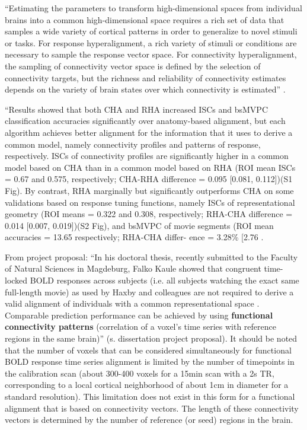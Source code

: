 ``Estimating the parameters to transform high-dimensional spaces from individual
brains into a common high-dimensional space requires a rich set of data that
samples a wide variety of cortical patterns in order to generalize to novel
stimuli or tasks. For response hyperalignment, a rich variety of stimuli or
conditions are necessary to sample the response vector space. For connectivity
hyperalignment, the sampling of connectivity vector space is defined by the
selection of connectivity targets, but the richness and reliability of
connectivity estimates depends on the variety of brain states over which
connectivity is estimated'' \citep{haxby2020hyperalignment}.

%
``Results showed that both CHA and RHA increased ISCs and bsMVPC classification
accuracies significantly over anatomy-based alignment, but each algorithm
achieves better alignment for the information that it uses to derive a common
model, namely connectivity profiles and patterns of response, respectively. ISCs
of connectivity profiles are significantly higher in a common model based on CHA
than in a common model based on RHA (ROI mean ISCs = 0.67 and 0.575,
respectively; CHA-RHA difference = 0.095 [0.081, 0.112])(S1 Fig). By contrast,
RHA marginally but significantly outperforms CHA on some validations based on
response tuning functions, namely ISCs of representational geometry (ROI means =
0.322 and 0.308, respectively; RHA-CHA difference = 0.014 [0.007, 0.019])(S2
Fig), and bsMVPC of movie segments (ROI mean accuracies = 13.65%
respectively; RHA-CHA differ- ence = 3.28\% [2.76%
\citep{guntupalli2018computational}.

From project proposal: ``In his doctoral thesis, recently submitted to the
Faculty of Natural Sciences in Magdeburg, Falko Kaule showed that congruent
time-locked BOLD responses across subjects (i.e. all subjects watching the exact
same full-length movie) as used by Haxby and colleagues are not required to
derive a valid alignment of individuals with a common representational space
\citep{kaule2017examination}.
%
Comparable prediction performance can be achieved by using \textbf{functional
connectivity patterns} (correlation of a voxel's time series with reference
regions in the same brain)'' (s. dissertation project proposal).
%
It should be noted that the number of voxels that can be considered
simultaneously for functional BOLD response time series alignment is limited by
the number of timepoints in the calibration scan (about 300-400 voxels for a
15min scan with a 2s TR, corresponding to a local cortical neighborhood of about
1cm in diameter for a standard resolution).
%
This limitation does not exist in this form for a functional alignment that is
based on connectivity vectors.
%
The length of these connectivity vectors is determined by the number of
reference (or seed) regions in the brain.

